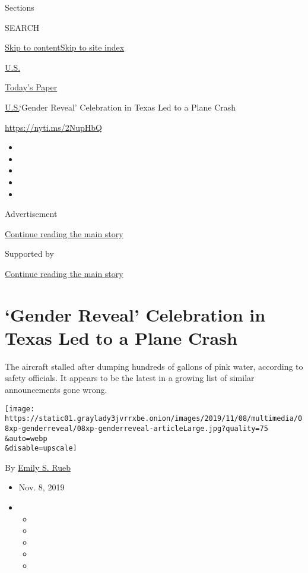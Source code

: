 Sections

SEARCH

\protect\hyperlink{site-content}{Skip to
content}\protect\hyperlink{site-index}{Skip to site index}

\href{https://www.nytimes3xbfgragh.onion/section/us}{U.S.}

\href{https://myaccount.nytimes3xbfgragh.onion/auth/login?response_type=cookie\&client_id=vi}{}

\href{https://www.nytimes3xbfgragh.onion/section/todayspaper}{Today's
Paper}

\href{/section/us}{U.S.}\textbar{}`Gender Reveal' Celebration in Texas
Led to a Plane Crash

\url{https://nyti.ms/2NupHbQ}

\begin{itemize}
\item
\item
\item
\item
\item
\end{itemize}

Advertisement

\protect\hyperlink{after-top}{Continue reading the main story}

Supported by

\protect\hyperlink{after-sponsor}{Continue reading the main story}

\hypertarget{gender-reveal-celebration-in-texas-led-to-a-plane-crash}{%
\section{`Gender Reveal' Celebration in Texas Led to a Plane
Crash}\label{gender-reveal-celebration-in-texas-led-to-a-plane-crash}}

The aircraft stalled after dumping hundreds of gallons of pink water,
according to safety officials. It appears to be the latest in a growing
list of similar announcements gone wrong.

\texttt{[image: https://static01.graylady3jvrrxbe.onion/images/2019/11/08/multimedia/08xp-genderreveal/08xp-genderreveal-articleLarge.jpg?quality=75\\\&auto=webp\\\&disable=upscale]}

By \href{https://www.nytimes3xbfgragh.onion/by/emily-s-rueb}{Emily S.
Rueb}

\begin{itemize}
\item
  Nov. 8, 2019
\item
  \begin{itemize}
  \item
  \item
  \item
  \item
  \item
  \end{itemize}
\end{itemize}

